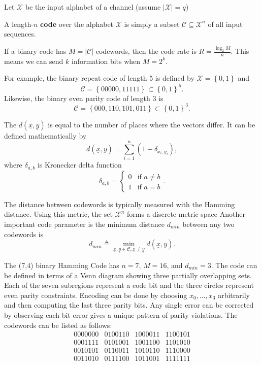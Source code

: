 Let $\mathcal{X}$ be the input alphabet of a channel (assume $\left|\mathcal{X}\right|=q$)
\begin{definition}
A length-$n$ \textbf{code} over the alphabet $\mathcal{X}$ is simply a subset $\mathcal{C}\subseteq\mathcal{X}^{n}$ of all input sequences.
\end{definition}
If a binary code has $M=\left|\mathcal{C}\right|$ codewords, then the code rate is $R=\frac{\log_{2}M}{n}$.
This means we can send $k$ information bits when $M=2^k$.

For example, the binary repeat code of length 5 is defined by $\mathcal{X}=\left\{ 0,1\right\}$ and
\[\mathcal{C}=\left\{ 00000,11111\right\} \subset\left\{ 0,1\right\} ^{5}. \]
Likewise, the binary even parity code of length 3 is
\[ \mathcal{C}=\left\{ 000,110,101,011\right\} \subset\left\{ 0,1\right\} ^{3} . \]

\begin{definition}
The  $d(\underline{x},\underline{y})$ is equal to the number of places where the vectors differ.
It can be defined mathematically by
\[ d(\underline{x},\underline{y}) = \sum_{i=1}^{n}( 1- \delta_{x_{i},y_{i}}), \]
where $\delta_{a,b}$ is Kronecker delta function
\[\delta_{a,b}=\begin{cases}
0 & \mbox{if }a\neq b\\
1 & \mbox{if }a=b\end{cases}. \]
\end{definition}

The distance between codewords is typically measured with the Hamming distance.
Using this metric, the set $\mathcal{X}^{n}$ forms a discrete metric space
Another important code parameter is the minimum distance $d_{min}$ between any two
codewords is
\[ d_{min}\triangleq\min_{\underline{x},\underline{y}\in\mathcal{C},\underline{x}\neq\underline{y}}d(\underline{x},\underline{y}).\]

\begin{example}
The (7,4) binary Hamming Code has $n=7$, $M=16$, and $d_{min}=3$.
The code can be defined in terms of a Venn diagram showing three partially overlapping sets.
Each of the seven subregions represent a code bit and the three circles represent even parity constraints.
Encoding can be done by choosing $x_0,\ldots,x_3$ arbitrarily and then computing the last three parity bits.
Any single error can be corrected by observing each bit error gives a unique pattern of parity violations.
The codewords can be listed as follows:
\[\begin{array}{cccc}
0000000 & 0100110 & 1000011 & 1100101\\
0001111 & 0101001 & 1001100 & 1101010\\
0010101 & 0110011 & 1010110 & 1110000\\
0011010 & 0111100 & 1011001 & 1111111
\end{array} \]
\end{example}

